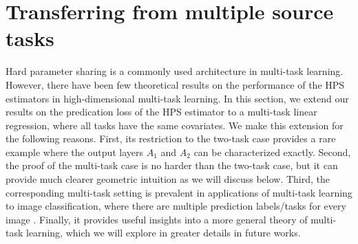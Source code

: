 \section{Transferring from multiple source tasks}\label{sec_same}


Hard parameter sharing is a commonly used architecture in multi-task learning. However, there have been few theoretical results on the performance of the HPS estimators in high-dimensional multi-task learning. In this section, we extend our results on the predication loss of the HPS estimator to a multi-task linear regression, where all tasks have the same covariates. We make this extension for the following reasons. First, its restriction to the two-task case provides a rare example where the output layers $A_1$ and $A_2$ can be characterized exactly. Second, the proof of the multi-task case is no harder than the two-task case, but it can provide much clearer geometric intuition  as we will discuss below. Third, the corresponding multi-task setting is prevalent in applications of multi-task learning to image classification, where there are multiple prediction labels/tasks for every image \cite{chexnet17,EA20}. Finally, it provides useful insights into a more general theory of multi-task learning, which we will explore in greater details in future works.

